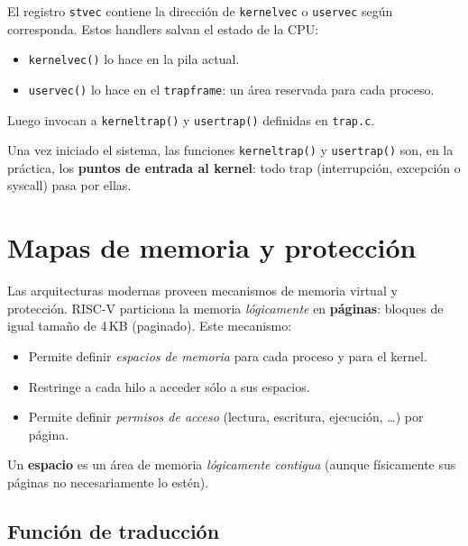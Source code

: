 \documentclass[11pt,a4paper]{article}
\begin{document}
El registro \texttt{stvec} contiene la dirección de \texttt{kernelvec}
o \texttt{uservec} según corresponda. Estos handlers salvan el estado
de la CPU:

\begin{itemize}[leftmargin=*,nosep]
    \item \texttt{kernelvec()} lo hace en la pila actual.
    \item \texttt{uservec()} lo hace en el \texttt{trapframe}: un área
        reservada para cada proceso.
\end{itemize}

Luego invocan a \texttt{kerneltrap()} y \texttt{usertrap()} definidas
en \texttt{trap.c}.

\begin{importante}
Una vez iniciado el sistema, las funciones \texttt{kerneltrap()} y
\texttt{usertrap()} son, en la práctica, los \textbf{puntos de entrada
al kernel}: todo trap (interrupción, excepción o syscall) pasa por
ellas.
\end{importante}

\section{Mapas de memoria y protección}

Las arquitecturas modernas proveen mecanismos de memoria virtual y
protección. RISC-V particiona la memoria \emph{lógicamente} en
\textbf{páginas}: bloques de igual tamaño de 4\,KB (paginado). Este
mecanismo:

\begin{itemize}[leftmargin=*,nosep]
    \item Permite definir \emph{espacios de memoria} para cada
        proceso y para el kernel.
    \item Restringe a cada hilo a acceder sólo a sus espacios.
    \item Permite definir \emph{permisos de acceso} (lectura,
        escritura, ejecución, \ldots) por página.
\end{itemize}

\begin{definicion}
Un \textbf{espacio} es un área de memoria \emph{lógicamente contigua}
(aunque físicamente sus páginas no necesariamente lo estén).
\end{definicion}

\subsection{Función de traducción}
\end{document}
